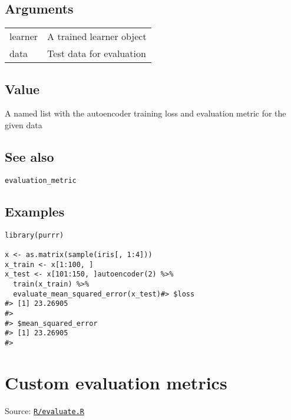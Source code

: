 \hypertarget{arguments}{\subsection{\texorpdfstring{\protect\hyperlink{arguments}{}Arguments}{Arguments}}\label{arguments}}

\begin{longtable}[c]{@{}ll@{}}
\toprule
learner & A trained learner object\tabularnewline
data & Test data for evaluation\tabularnewline
\bottomrule
\end{longtable}

\hypertarget{value}{\subsection{\texorpdfstring{\protect\hyperlink{value}{}Value}{Value}}\label{value}}

A named list with the autoencoder training loss and evaluation metric
for the given data

\hypertarget{see-also}{\subsection{\texorpdfstring{\protect\hyperlink{see-also}{}See
also}{See also}}\label{see-also}}

\texttt{evaluation\_metric}

\hypertarget{examples}{\subsection{\texorpdfstring{\protect\hyperlink{examples}{}Examples}{Examples}}\label{examples}}

\begin{verbatim}
library(purrr)

x <- as.matrix(sample(iris[, 1:4]))
x_train <- x[1:100, ]
x_test <- x[101:150, ]autoencoder(2) %>%
  train(x_train) %>%
  evaluate_mean_squared_error(x_test)#> $loss
#> [1] 23.26905
#> 
#> $mean_squared_error
#> [1] 23.26905
#> 
\end{verbatim}

\section{Custom evaluation metrics}\label{custom-evaluation-metrics}

Source:
\href{https://github.com/fdavidcl/ruta/blob/master/R/evaluate.R}{\texttt{R/evaluate.R}}

